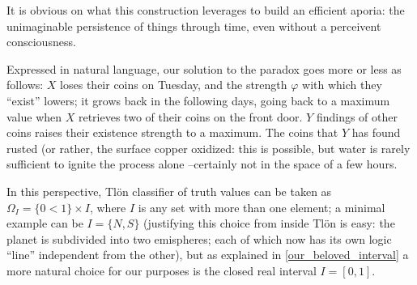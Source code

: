 \begin{example}
	It is obvious on what this construction leverages to build an efficient aporia: the unimaginable persistence of things through time, even without a perceivent consciousness.

	Expressed in natural language, our solution to the paradox goes more or less as follows: $X$ loses their coins on Tuesday, and the strength $\varphi$ with which they ``exist'' lowers; it grows back in the following days, going back to a maximum value when $X$ retrieves two of their coins on the front door. $Y$ findings of other coins raises their existence strength to a maximum. The coins that $Y$ has found rusted (or rather, the surface copper oxidized: this is possible, but water is rarely sufficient to ignite the process alone --certainly not in the space of a few hours.
	\begin{remark}\label{our_beloved_interval}
		In this perspective, Tl\"on classifier of truth values can be taken as $\Omega_I = \{0<1\}\times I$, where $I$ is any set with more than one element; a minimal example can be $I=\{N,S\}$ (justifying this choice from inside Tl\"on is easy: the planet is subdivided into two emispheres; each of which now has its own logic ``line'' independent from the other), but as explained in \autoref{our_beloved_interval} a more natural choice for our purposes is the closed real interval $I=[0,1]$.


\end{remark}
\end{example}
